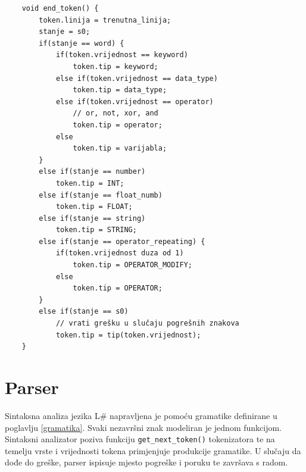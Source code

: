 \documentclass[times, utf8, zavrsni]{fer}
\begin{document}
\begin{verbatim}
    void end_token() {
        token.linija = trenutna_linija;
        stanje = s0;
        if(stanje == word) {
            if(token.vrijednost == keyword)
                token.tip = keyword;
            else if(token.vrijednost == data_type)
                token.tip = data_type;
            else if(token.vrijednost == operator)
                // or, not, xor, and
                token.tip = operator;
            else
                token.tip = varijabla;
        }
        else if(stanje == number)
            token.tip = INT;
        else if(stanje == float_numb)
            token.tip = FLOAT;
        else if(stanje == string)
            token.tip = STRING;
        else if(stanje == operator_repeating) {
            if(token.vrijednost duza od 1)
                token.tip = OPERATOR_MODIFY;
            else
                token.tip = OPERATOR;
        }
        else if(stanje == s0)
            // vrati grešku u slučaju pogrešnih znakova
            token.tip = tip(token.vrijednost);
    }
\end{verbatim}

\section{Parser}
Sintaksna analiza jezika L\# napravljena je pomoću gramatike definirane u poglavlju \ref{gramatika}. Svaki nezavršni znak modeliran je jednom funkcijom.
Sintaksni analizator poziva funkciju \verb|get_next_token()| tokenizatora te na temelju vrste i vrijednosti tokena primjenjuje produkcije gramatike.
U slučaju da dođe do greške, parser ispisuje mjesto pogreške i poruku te završava s radom.
\end{document}
